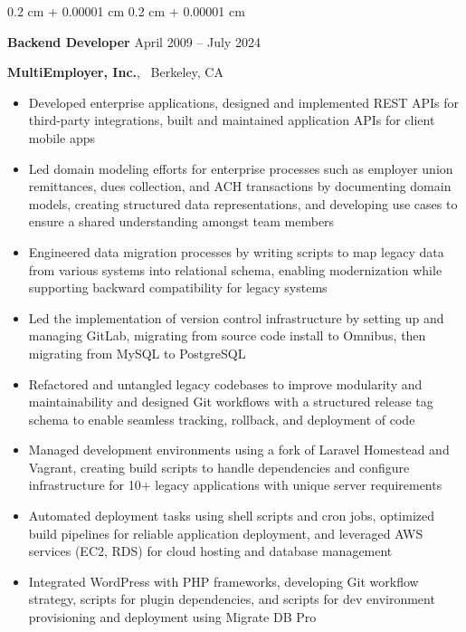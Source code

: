 \documentclass[10pt, letterpaper]{article}
\newenvironment{highlights}{
    \begin{itemize}[
        topsep=0.10 cm,
        parsep=0.10 cm,
        partopsep=0pt,
        itemsep=0pt,
        leftmargin=0.4 cm + 10pt
    ]
}{
    \end{itemize}
} %
\newenvironment{onecolentry}{
    \begin{adjustwidth}{
        0.2 cm + 0.00001 cm
    }{
        0.2 cm + 0.00001 cm
    }
}{
    \end{adjustwidth}
} %
\begin{document}
            \begin{onecolentry}
                \textbf{Backend Developer} \hfill April 2009 -- July 2024

                \textbf{MultiEmployer, Inc.}, \textbar\ Berkeley, CA

                \begin{highlights}
                    
                        \item Developed enterprise applications, designed and implemented REST APIs for third-party integrations, built and maintained application APIs for client mobile apps
                    
                        \item Led domain modeling efforts for enterprise processes such as employer union remittances, dues collection, and ACH transactions by documenting domain models, creating structured data representations, and developing use cases to ensure a shared understanding amongst team members
                    
                        \item Engineered data migration processes by writing scripts to map legacy data from various systems into relational schema, enabling modernization while supporting backward compatibility for legacy systems
                    
                        \item Led the implementation of version control infrastructure by setting up and managing GitLab, migrating from source code install to Omnibus, then migrating from MySQL to PostgreSQL
                    
                        \item Refactored and untangled legacy codebases to improve modularity and maintainability and designed Git workflows with a structured release tag schema to enable seamless tracking, rollback, and deployment of code
                    
                        \item Managed development environments using a fork of Laravel Homestead and Vagrant, creating build scripts to handle dependencies and configure infrastructure for 10+ legacy applications with unique server requirements
                    
                        \item Automated deployment tasks using shell scripts and cron jobs, optimized build pipelines for reliable application deployment, and leveraged AWS services (EC2, RDS) for cloud hosting and database management
                    
                        \item Integrated WordPress with PHP frameworks, developing Git workflow strategy, scripts for plugin dependencies, and scripts for dev environment provisioning and deployment using Migrate DB Pro
                    
                \end{highlights}

            \end{onecolentry}
\end{document}
